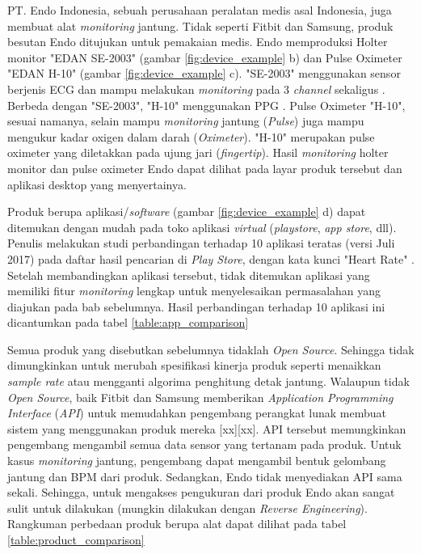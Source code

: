 PT. Endo Indonesia, sebuah perusahaan peralatan medis asal Indonesia, juga membuat alat \textit{monitoring} jantung. Tidak seperti Fitbit dan Samsung, produk besutan Endo ditujukan untuk pemakaian medis. Endo memproduksi Holter monitor "EDAN SE-2003" (gambar \ref{fig:device_example} b) dan Pulse Oximeter "EDAN H-10" (gambar \ref{fig:device_example} c). "SE-2003" menggunakan sensor berjenis ECG dan mampu melakukan \textit{monitoring} pada 3 \textit{channel} sekaligus \cite{endo_holter}. Berbeda dengan "SE-2003", "H-10" menggunakan PPG \cite{endo_oxi}. Pulse Oximeter "H-10", sesuai namanya, selain mampu \textit{monitoring} jantung (\textit{Pulse}) juga mampu mengukur kadar oxigen dalam darah (\textit{Oximeter}). "H-10" merupakan pulse oximeter yang diletakkan pada ujung jari (\textit{fingertip}). Hasil \textit{monitoring} holter monitor dan pulse oximeter Endo dapat dilihat pada layar produk tersebut dan aplikasi desktop yang menyertainya.

Produk berupa aplikasi/\textit{software} (gambar \ref{fig:device_example} d) dapat ditemukan dengan mudah pada toko aplikasi \textit{virtual} (\textit{playstore}, \textit{app store}, dll). Penulis melakukan studi perbandingan terhadap 10 aplikasi teratas (versi Juli 2017) pada daftar hasil pencarian di \textit{Play Store}, dengan kata kunci "Heart Rate" \cite{playstore_heart}. Setelah membandingkan aplikasi tersebut, tidak ditemukan aplikasi yang memiliki fitur \textit{monitoring} lengkap untuk menyelesaikan permasalahan yang diajukan pada bab sebelumnya. Hasil perbandingan terhadap 10 aplikasi ini dicantumkan pada tabel \ref{table:app_comparison}

Semua produk yang disebutkan sebelumnya tidaklah \textit{Open Source}. Sehingga tidak dimungkinkan untuk merubah spesifikasi kinerja produk seperti menaikkan \textit{sample rate} atau mengganti algorima penghitung detak jantung. Walaupun tidak \textit{Open Source}, baik Fitbit dan Samsung memberikan \textit{Application Programming Interface} (\textit{API}) untuk memudahkan pengembang perangkat lunak membuat sistem yang menggunakan produk mereka [xx][xx]. API tersebut memungkinkan pengembang mengambil semua data sensor yang tertanam pada produk. Untuk kasus \textit{monitoring} jantung, pengembang dapat mengambil bentuk gelombang jantung dan BPM dari produk. Sedangkan, Endo tidak menyediakan API sama sekali. Sehingga, untuk mengakses pengukuran dari produk Endo akan sangat sulit untuk dilakukan (mungkin dilakukan dengan \textit{Reverse Engineering}). Rangkuman perbedaan produk berupa alat dapat dilihat pada tabel \ref{table:product_comparison}

